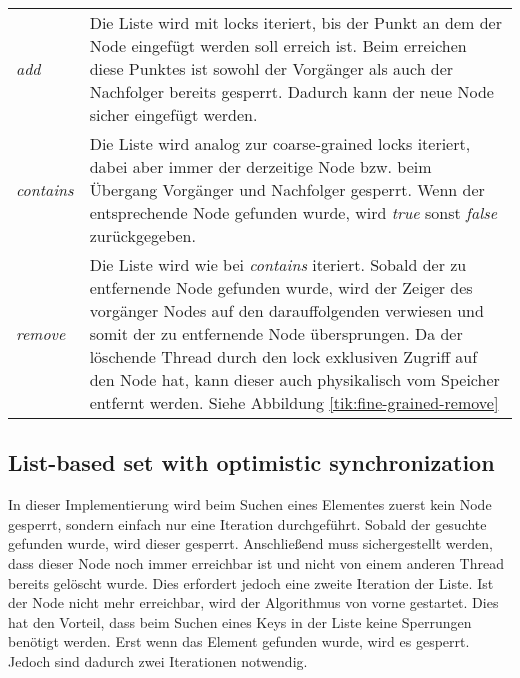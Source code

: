\begin{table}[H]
    \begin{tabularx}{\textwidth}{lX}
		\textit{add} & Die Liste wird mit locks iteriert, bis der Punkt an dem der Node eingefügt werden soll erreich ist. Beim erreichen diese Punktes ist
		 sowohl der Vorgänger als auch der Nachfolger bereits gesperrt. Dadurch kann der neue Node sicher eingefügt werden.\\
		\textit{contains} & Die Liste wird analog zur coarse-grained locks iteriert, dabei aber immer der derzeitige Node bzw. beim Übergang Vorgänger und Nachfolger gesperrt. 
		Wenn der entsprechende Node gefunden wurde, wird \textit{true} sonst \textit{false} zurückgegeben. \\
		\textit{remove} & Die Liste wird wie bei \textit{contains} iteriert. Sobald der zu entfernende Node gefunden wurde, wird der Zeiger des vorgänger Nodes
		auf den darauffolgenden verwiesen und somit der zu entfernende Node übersprungen. Da der löschende Thread durch den lock exklusiven Zugriff auf den Node hat,
		kann dieser auch physikalisch vom Speicher entfernt werden. 
		Siehe Abbildung \ref{tik:fine-grained-remove}\\
    \end{tabularx}
\end{table}


\subsection{List-based set with optimistic synchronization}

In dieser Implementierung wird beim Suchen eines Elementes zuerst kein Node gesperrt, sondern einfach nur eine Iteration durchgeführt. 
Sobald der gesuchte gefunden wurde, wird dieser gesperrt. Anschließend muss sichergestellt werden, dass dieser Node noch immer erreichbar ist 
und nicht von einem anderen Thread bereits gelöscht wurde. Dies erfordert jedoch eine zweite Iteration der Liste. Ist der Node nicht mehr erreichbar, 
wird der Algorithmus von vorne gestartet. Dies hat den Vorteil, dass beim Suchen eines Keys in der Liste keine Sperrungen benötigt werden. 
Erst wenn das Element gefunden wurde, wird es gesperrt. Jedoch sind dadurch zwei Iterationen notwendig.

